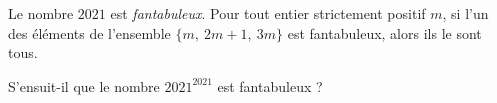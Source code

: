 Le nombre $2021$ est \emph{fantabuleux}. Pour tout entier strictement positif $m$, si l'un des éléments de l'ensemble $\{m,\ 2m+1,\ 3m\}$ est fantabuleux, alors ils le sont tous.

S'ensuit-il que le nombre $2021^{2021}$ est fantabuleux ?
